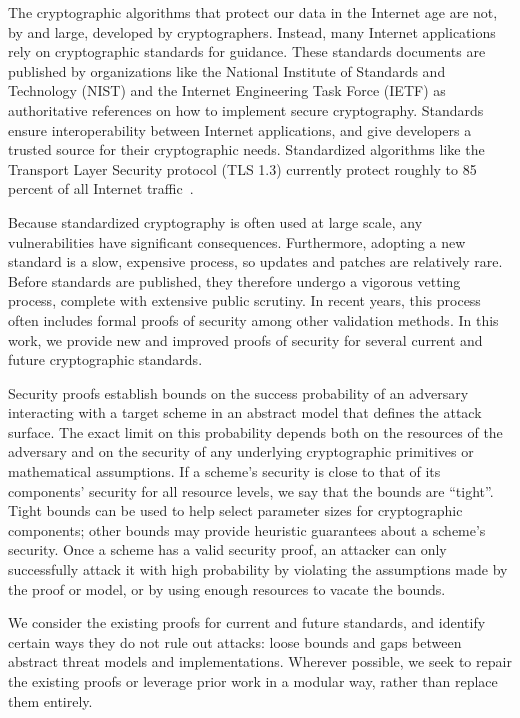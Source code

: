 The cryptographic algorithms that protect our data in the Internet age are not, by and large, developed by cryptographers. Instead, many Internet applications rely on cryptographic standards for guidance. These standards documents are published by organizations like the National Institute of Standards and Technology (NIST) and the Internet Engineering Task Force (IETF) as authoritative references on how to implement secure cryptography. Standards ensure interoperability between Internet applications, and give developers a trusted source for their cryptographic needs. Standardized algorithms like the Transport Layer Security protocol (TLS 1.3) currently protect roughly to 85 percent of all Internet traffic~\cite{fortinet}.

Because standardized cryptography is often used at large scale, any vulnerabilities have significant consequences. Furthermore, adopting a new standard is a slow, expensive process, so updates and patches are relatively rare. Before standards are published, they therefore undergo a vigorous vetting process, complete with extensive public scrutiny. In recent years, this process often includes formal proofs of security among other validation methods. In this work, we provide new and improved proofs of security for several current and future cryptographic standards.

Security proofs establish bounds on the success probability of an adversary interacting with a target scheme in an abstract model that defines the attack surface. The exact limit on this probability depends both on the resources of the adversary and on the security of any underlying cryptographic primitives or mathematical assumptions. If a scheme's security is close to that of its components' security for all resource levels, we say that the bounds are ``tight''. Tight bounds can be used to help select parameter sizes for cryptographic components; other bounds may provide heuristic guarantees about a scheme's security. Once a scheme has a valid security proof, an attacker can only successfully attack it with high probability by violating the assumptions made by the proof or model, or by using enough resources to vacate the bounds.

We consider the existing proofs for current and future standards, and identify certain ways they do not rule out attacks: loose bounds and gaps between abstract threat models and implementations. Wherever possible, we seek to repair the existing proofs or leverage prior work in a modular way, rather than replace them entirely. 

